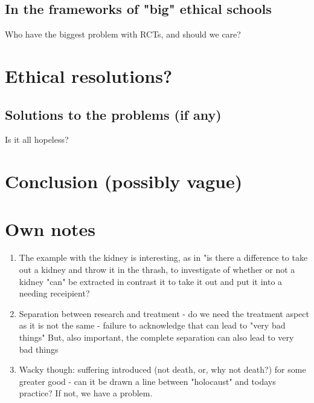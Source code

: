 \documentclass[12p]{article}
\begin{document}
\subsection*{In the frameworks of "big" ethical schools}
Who have the biggest problem with RCTs, and should we care?


\section*{Ethical resolutions?}
\subsection*{Solutions to the problems (if any)}
Is it all hopeless?
\section*{Conclusion (possibly vague)}

\section*{Own notes}

\begin{enumerate}

\item
  The example with the kidney is interesting, as in "is there a difference to take out a kidney 
  and throw it in the thrash, to investigate of whether or not a kidney "can" be extracted in contrast
  it to take it out and put it into a needing receipient?
\item
  Separation between research and treatment - do we need the treatment aspect as it is not the same - failure to acknowledge that can lead to "very bad things"
  But, also important, the complete separation can also lead to very bad things
\item
  Wacky though: suffering introduced (not death, or, why not death?) for some greater good - can it be drawn a line between "holocaust" and todays practice? 
  If not, we have a problem.
  
  \end{enumerate}




 
\end{document}
